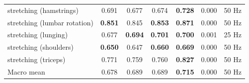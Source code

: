 \begin{table}[H]
\begin{tabular}{lcccccc}
    stretching (hamstrings)        & 0.691 & 0.677 & 0.674 & \textbf{0.728} & 0.000 & 50 Hz \\
    stretching (lumbar rotation)   & \textbf{0.851} & 0.845 & \textbf{0.853} & \textbf{0.871} & 0.000 & 50 Hz \\
    stretching (lunging)           & 0.677 & \textbf{0.694} & \textbf{0.701} & \textbf{0.700} & 0.001 & 25 Hz \\
    stretching (shoulders)         & \textbf{0.650} & 0.647 & \textbf{0.660} & \textbf{0.669} & 0.000 & 50 Hz \\
    stretching (triceps)           & 0.771 & 0.759 & 0.760 & \textbf{0.827} & 0.000 & 50 Hz \\
    \midrule
    Macro mean                     & 0.678 & 0.689 & 0.689 & \textbf{0.715} & 0.000 & 50 Hz \\
    \bottomrule
  \end{tabular}
\end{table}
